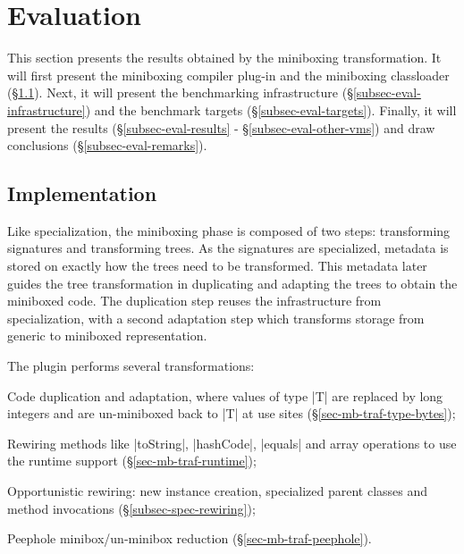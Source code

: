 \section{Evaluation}
\label{sec-evaluation}

\newcommand{\sctx}[0]{Single Context}
\newcommand{\mctx}[0]{Multi Context}
\newcommand{\bn}[1]{\textbf{#1}}
\newcommand{\opt}[1]{#1}

This section presents the results obtained by the miniboxing transformation. It will first present the miniboxing compiler plug-in and the miniboxing classloader (\S\ref{subsec-eval-impl}). Next, it will present the benchmarking infrastructure (\S\ref{subsec-eval-infrastructure}) and the benchmark targets (\S\ref{subsec-eval-targets}). Finally, it will present the results (\S\ref{subsec-eval-results} - \S\ref{subsec-eval-other-vms}) and draw conclusions (\S\ref{subsec-eval-remarks}).

\subsection{Implementation}
\label{subsec-eval-impl}

 Like specialization, the miniboxing phase is composed of two steps: transforming signatures and transforming trees. As the signatures are specialized, metadata is stored on exactly how the trees need to be transformed. This metadata later guides the tree transformation in duplicating and adapting the trees to obtain the miniboxed code. The duplication step reuses the infrastructure from specialization, with a second adaptation step which transforms storage from generic to miniboxed representation.   

The plugin performs several transformations:
\begin{packed_item}
\item Code duplication and adaptation, where values of type |T| are replaced by long integers and are un-miniboxed back to |T| at use sites (\S\ref{sec-mb-traf-type-bytes});
\item Rewiring methods like |toString|, |hashCode|, |equals| and array operations to use the runtime support (\S\ref{sec-mb-traf-runtime});
\item Opportunistic rewiring: new instance creation, specialized parent classes and method invocations (\S\ref{subsec-spec-rewiring});
\item Peephole minibox/un-minibox reduction (\S\ref{sec-mb-traf-peephole}).
\end{packed_item}
 
